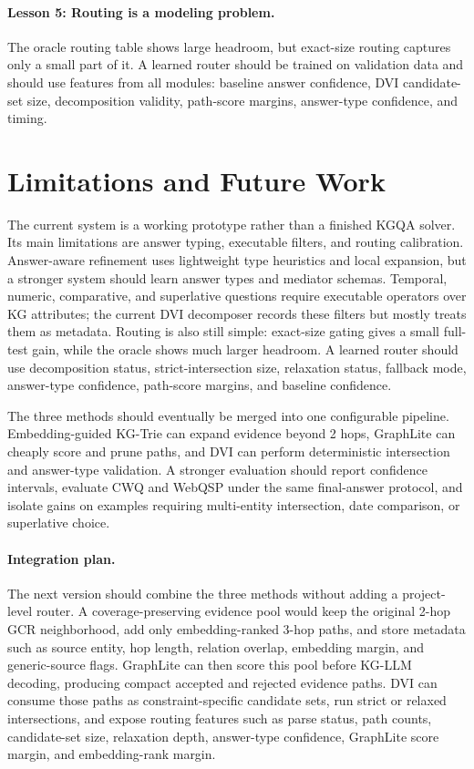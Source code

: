 \documentclass[10pt,twocolumn]{article}
\begin{document}
\paragraph{Lesson 5: Routing is a modeling problem.}
The oracle routing table shows large headroom, but exact-size routing captures only a small part of it. A learned router should be trained on validation data and should use features from all modules: baseline answer confidence, DVI candidate-set size, decomposition validity, path-score margins, answer-type confidence, and timing.

\section{Limitations and Future Work}
The current system is a working prototype rather than a finished KGQA solver. Its main limitations are answer typing, executable filters, and routing calibration. Answer-aware refinement uses lightweight type heuristics and local expansion, but a stronger system should learn answer types and mediator schemas. Temporal, numeric, comparative, and superlative questions require executable operators over KG attributes; the current DVI decomposer records these filters but mostly treats them as metadata. Routing is also still simple: exact-size gating gives a small full-test gain, while the oracle shows much larger headroom. A learned router should use decomposition status, strict-intersection size, relaxation status, fallback mode, answer-type confidence, path-score margins, and baseline confidence.

The three methods should eventually be merged into one configurable pipeline. Embedding-guided KG-Trie can expand evidence beyond 2 hops, GraphLite can cheaply score and prune paths, and DVI can perform deterministic intersection and answer-type validation. A stronger evaluation should report confidence intervals, evaluate CWQ and WebQSP under the same final-answer protocol, and isolate gains on examples requiring multi-entity intersection, date comparison, or superlative choice.


\paragraph{Integration plan.}
The next version should combine the three methods without adding a project-level router. A coverage-preserving evidence pool would keep the original 2-hop GCR neighborhood, add only embedding-ranked 3-hop paths, and store metadata such as source entity, hop length, relation overlap, embedding margin, and generic-source flags. GraphLite can then score this pool before KG-LLM decoding, producing compact accepted and rejected evidence paths. DVI can consume those paths as constraint-specific candidate sets, run strict or relaxed intersections, and expose routing features such as parse status, path counts, candidate-set size, relaxation depth, answer-type confidence, GraphLite score margin, and embedding-rank margin.
\end{document}
